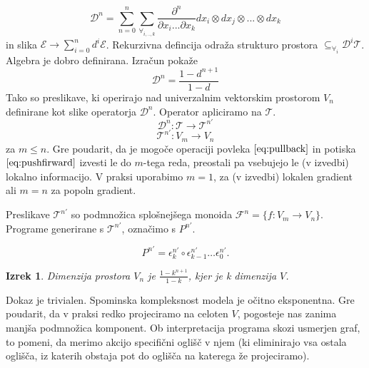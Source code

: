 \documentclass{article}
\newcommand{\E}{\mathcal{E}}
\newcommand{\T}{\mathcal{T}}
\newcommand{\F}{\mathcal{F}}
\newcommand{\D}{\mathcal{D}}
\newcommand{\Op}{\partial^{\bigoplus}}
\newtheorem{izrek}{Izrek}[section]
\begin{document}
\begin{equation}
	\D^n=\sum\limits_{n=0}^{n}\sum_{\forall_{i,..,k}}\frac{\partial^n }{\partial x_i...\partial x_k}dx_i\otimes dx_j\otimes...\otimes dx_k
\end{equation}
 in slika $\E\to\sum\limits_{i=0}^nd^i\E$. Rekurzivna defincija odraža strukturo prostora $\subseteq_{\forall_i}\D^i\T$. Algebra je dobro definirana. Izračun pokaže
 \begin{equation}
 \D^n=\frac{1- d^{n+1}}{1- d}
 \end{equation}
 Tako so preslikave, ki operirajo nad univerzalnim vektorskim prostorom $V_n$ definirane kot slike operatorja $\D^n$. Operator apliciramo na $\T$.
 \begin{equation}
 	\D^n:\T\to \T^{n'}
 \end{equation}
 \begin{equation}\label{eq:t^n}
 	\T^{n'}:V_m\to V_n 
 \end{equation}
 za $m\le n$. Gre poudarit, da je mogoče operaciji povleka $\eqref{eq:pullback}$ in potiska $\eqref{eq:pushfirward}$ izvesti le do $m$-tega reda, preostali pa vsebujejo le (v izvedbi) lokalno informacijo. V praksi uporabimo $m=1$, za (v izvedbi) lokalen gradient ali $m=n$ za popoln gradient. \label{note:m<=n}
 
 Preslikave $\T^{n'}$ so podmnožica splošnejšega monoida $\F^n=\{f:V_m\to V_n\}$. Programe generirane s $\T^{n'}$, označimo s $P^{n'}$.
 
 $$P^{n'} = \epsilon^{n'}_k\circ\epsilon^{n'}_{k-1}\ldots\epsilon^{n'}_0.$$
 \begin{izrek}
 Dimenzija prostora $V_n$ je $\frac{1-k^{n+1}}{1-k}$, kjer je k dimenzija $V$.
 \end{izrek}
 
 Dokaz je trivialen. Spominska kompleksnost modela je očitno eksponentna. Gre poudarit, da v praksi redko projeciramo na celoten $V$, pogosteje nas zanima manjša podmnožica komponent. Ob interpretacija programa skozi usmerjen graf, to pomeni, da merimo akcijo specifični oglišč v njem (ki eliminirajo vsa ostala oglišča, iz katerih obstaja pot do oglišča na katerega že projeciramo).
 
 
\end{document}
